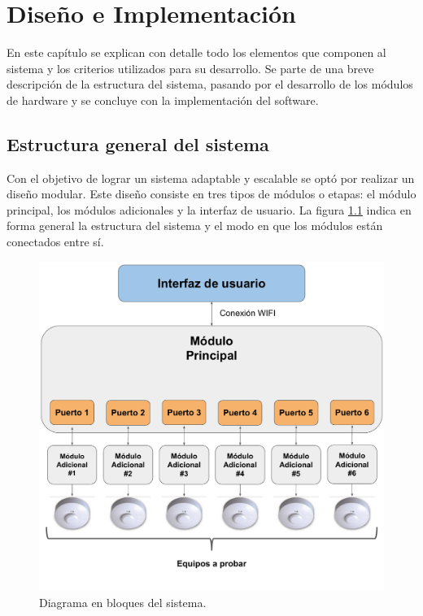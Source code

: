 \chapter{Diseño e Implementación} %

\label{Chapter3} %


En este capítulo se explican con detalle todo los elementos que componen al sistema y los criterios utilizados para su desarrollo. Se parte de una breve descripción de la estructura del sistema, pasando por el desarrollo de los módulos de hardware y se concluye con la implementación del software.


\section{Estructura general del sistema}
Con el objetivo de lograr un sistema adaptable y escalable se optó por realizar un diseño modular. Este diseño consiste en tres tipos de módulos o etapas: el módulo principal, los módulos adicionales y la interfaz de usuario. La figura \ref{fig:BloquesGral} indica en forma general la estructura del sistema y el modo en que los módulos están conectados entre sí.


\begin{figure}[ht]
	\centering
	\includegraphics[scale=0.5]{./Figures/BloquesGral.pdf}
	\caption{Diagrama en bloques del sistema.}
	\label{fig:BloquesGral}
\end{figure}

